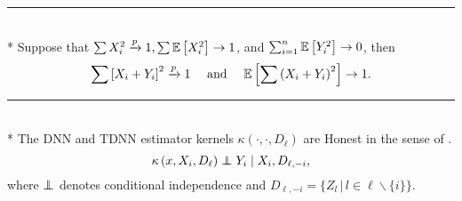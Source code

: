 \hrule

\begin{lem}\label{lem:peng1}\mbox{}\\*
	Suppose that $\sum X_{i}^2 \xrightarrow{p} 1, \sum \mathbb{E}\left[X_{i}^2\right] \rightarrow 1$, and $\sum_{i=1}^n \mathbb{E}\left[Y_{i}^2\right] \rightarrow 0$, then
	\begin{equation}
		\sum\left[X_{i}+Y_{i}\right]^2 \xrightarrow{p} 1 
        \quad \text { and } \quad 
        \mathbb{E}\left[\sum\left(X_{i}+Y_{i}\right)^2\right] \rightarrow 1.
	\end{equation}
\end{lem}

\hrule

\begin{lem}\label{lem:honesty}\mbox{}\\*
	The DNN and TDNN estimator kernels $\kappa\left(\cdot, \cdot, D_{\ell}\right)$ are Honest in the sense of \citet{wager_estimation_2018}.
	\begin{equation*}
		\kappa\left(x, X_{i}, D_{\ell}\right) \perp\!\!\!\!\perp Y_{i} \mid X_{i}, D_{\ell,-i},
	\end{equation*}
	where $\perp\!\!\!\!\perp$ denotes conditional independence and $D_{\ell,-i} = \{Z_l \, | \, l \in \ell \backslash \{i\}\}$.
\end{lem}
